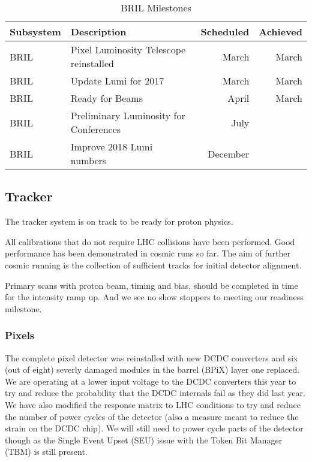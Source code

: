 \documentclass[12pt]{article}
\begin{document}
\begin{table}[htp]
\caption{BRIL Milestones}
\begin{center}
\begin{tabular}{|l|l|r|r|}
\hline
Subsystem&Description&Scheduled&Achieved\\
\hline
BRIL & Pixel Luminosity Telescope reinstalled & March & March \\
\hline
BRIL & Update Lumi for 2017 & March &  March \\
\hline
BRIL& Ready for Beams & April & March   \\
\hline
BRIL & Preliminary Luminosity for Conferences & July & \\
\hline
BRIL & Improve 2018 Lumi numbers & December  & \\
\hline
\end{tabular}
\end{center}
\label{BRILMIlestones}
\end{table}%


\subsection{Tracker }

The tracker system is on track to be ready for proton physics.

All calibrations that do not require LHC collisions have been performed.  Good performance has been demonstrated in cosmic runs so far.  The aim of further cosmic running is the collection of sufficient tracks for initial detector alignment.

Primary scans with proton beam, timing and bias, should be
completed in time for the intensity ramp up. And we see no
show stoppers to meeting our readiness milestone.

\subsubsection{Pixels }

The complete pixel detector was reinstalled with new DCDC converters
and six (out of eight) severly damaged modules in the barrel (BPiX) layer one replaced. We are operating at a lower input voltage to the DCDC converters this year to try and reduce the 
probability that the DCDC internals fail as they did last year. We have
also modified the response matrix to LHC conditions to try and reduce the
number of power cycles of the detector (also a measure meant to reduce the
strain on the DCDC chip). We will still need to power cycle parts of the
detector though as the Single Event Upset (SEU) issue with the Token Bit Manager (TBM) is still present.
\end{document}
